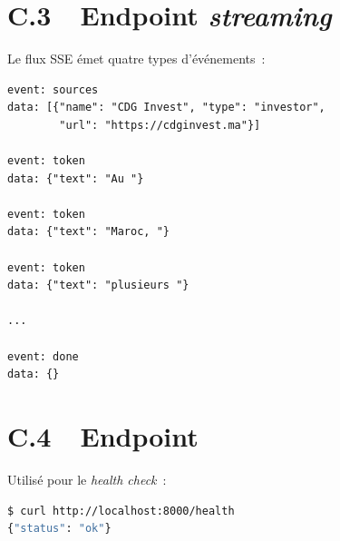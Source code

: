 \section*{C.3~~Endpoint \textit{streaming} }

Le flux \ac{SSE} émet quatre types d'événements~:

\begin{lstlisting}[caption={Exemple de flux \ac{SSE} émis par \code{/api/chat/stream}.}]
event: sources
data: [{"name": "CDG Invest", "type": "investor",
        "url": "https://cdginvest.ma"}]

event: token
data: {"text": "Au "}

event: token
data: {"text": "Maroc, "}

event: token
data: {"text": "plusieurs "}

...

event: done
data: {}
\end{lstlisting}

\section*{C.4~~Endpoint }

Utilisé pour le \textit{health check}~:

\begin{lstlisting}[language=bash]
$ curl http://localhost:8000/health
{"status": "ok"}
\end{lstlisting}

